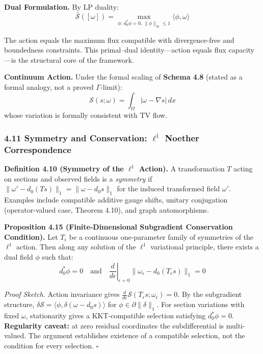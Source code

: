\documentclass[
]{article}
\begin{document}
\textbf{Dual Formulation.} By LP duality:
\[ \bar{\mathcal{S}}([\omega]) = \max_{\phi:\, d_0^* \phi = 0,\, \|\phi\|_\infty \le 1} \langle \phi, \omega \rangle \]

The action equals the maximum flux compatible with divergence-free and boundedness constraints. This primal--dual identity---action equals flux capacity---is the structural core of the framework.

\textbf{Continuum Action.} Under the formal scaling of \textbf{Schema 4.8} (stated as a formal analogy, not a proved \(\Gamma\)-limit):
\[ \mathcal{S}(s;\omega) = \int_\Omega |\omega-\nabla s| \, dx \]
whose variation is formally consistent with TV flow.

\subsubsection{\texorpdfstring{4.11 Symmetry and Conservation: \(\ell^1\) Noether Correspondence}{4.11 Symmetry and Conservation: \textbackslash ell\^{}1 Noether Correspondence}}\label{symmetry-and-conservation-ell1-noether-correspondence}

\textbf{Definition 4.10 (Symmetry of the \(\ell^1\) Action).} A transformation \(T\) acting on sections and observed fields is a \emph{symmetry} if \(\|\omega'-d_0(Ts)\|_1 = \|\omega-d_0s\|_1\) for the induced transformed field \(\omega'\). Examples include compatible additive gauge shifts, unitary conjugation (operator-valued case, Theorem 4.10), and graph automorphisms.

\textbf{Proposition 4.15 (Finite-Dimensional Subgradient Conservation Condition).} Let \(T_\epsilon\) be a continuous one-parameter family of symmetries of the \(\ell^1\) action. Then along any solution of the \(\ell^1\) variational principle, there exists a dual field \(\phi\) such that:
\[ d_0^* \phi = 0 \quad \text{and} \quad \left.\frac{d}{d\epsilon}\right|_{\epsilon=0} \|\omega_\epsilon-d_0(T_\epsilon s)\|_1 = 0 \]

\emph{Proof Sketch.} Action invariance gives \(\frac{d}{d\epsilon} \mathcal{S}(T_\epsilon s;\omega_\epsilon) = 0\). By the subgradient structure, \(\delta \mathcal{S} = \langle \phi, \delta(\omega-d_0s) \rangle\) for \(\phi \in \partial \|\delta\|_1\). For section variations with fixed \(\omega\), stationarity gives a KKT-compatible selection satisfying \(d_0^*\phi=0\). \textbf{Regularity caveat:} at zero residual coordinates the subdifferential is multi-valued. The argument establishes existence of a compatible selection, not the condition for every selection. \(\square\)
\end{document}
